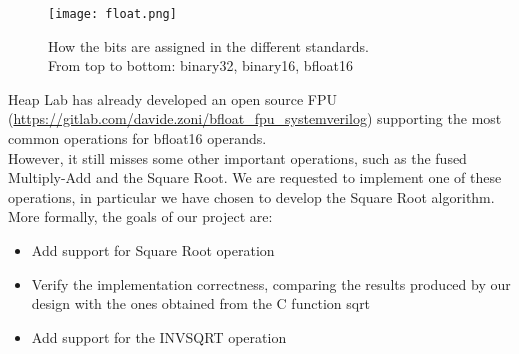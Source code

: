 \begin{figure}[h]
	\centering
	\captionsetup{justification=centering}
	\texttt{[image: float.png]}	
	\caption{How the bits are assigned in the different standards. \\From top to bottom: binary32, binary16, bfloat16}
\end{figure}

Heap Lab has already developed an open source FPU (\url{https://gitlab.com/davide.zoni/bfloat_fpu_systemverilog}) supporting the most common operations for bfloat16 operands. \\
However, it still misses some other important operations, such as the fused Multiply-Add and the Square Root. We are requested to implement one of these operations, in particular we have chosen to develop the Square Root algorithm.\\

More formally, the goals of our project are:
\begin{itemize}
	\item Add support for Square Root operation
	\item Verify the implementation correctness, comparing the results produced by our design with the ones obtained from the 		C function sqrt
	\item Add support for the INVSQRT operation
\end{itemize}

\clearpage